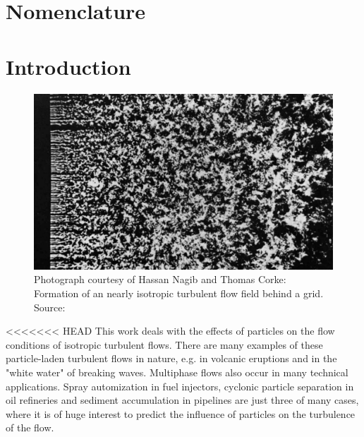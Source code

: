 \documentclass[11pt,a4paper,openany,oneside,parskip=half*]{article}
\begin{document}
\makenomenclature %


\renewcommand{\refname}{}
\renewcommand{\nomname}{}



\setlength{\columnsep}{30pt}
\setlength{\parindent}{0pt}

\pagebreak
\tableofcontents{} %
\thispagestyle{empty}
\pagebreak

\renewcommand{\thesection}{\Roman{section}}

\section{Nomenclature}
\printnomenclature
\pagebreak
\renewcommand{\thesection}{\arabic{section}}
\setcounter{section}{0}
\section{Introduction}
\setcounter{page}{1}
\begin{figure}[h]
	\centering
  \includegraphics[width=\textwidth]{./Abbildungen/TurbulentMotion_Introduction.png}
  \captionsetup{width=0.97\linewidth}
	\caption{Photograph courtesy of Hassan Nagib and Thomas Corke: Formation of an nearly isotropic turbulent flow field behind a grid. Source: \cite{albumOfTurbulentMotion}}
	\label{introduction_picture}
\end{figure}
<<<<<<< HEAD
This work deals with the effects of particles on the flow conditions of isotropic turbulent flows.
There are many examples of these particle-laden turbulent flows in nature, e.g. in volcanic eruptions and in the "white water" of breaking waves.
\newline
Multiphase flows also occur in many technical applications. Spray automization in fuel injectors, cyclonic particle separation in oil refineries and sediment accumulation in pipelines are just three of many cases, where it is of huge interest to predict the influence of particles on the turbulence of the flow.
\end{document}
